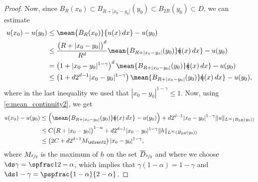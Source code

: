\begin{proof}
Now, since $B_{R}(x_0)\subset B_{R+|x_0-y_0|}(y_0)\subset B_{2R}(y_0)\subset D$, we can estimate
\begin{align*}
u(x_0)-u(y_0)&\le \mean{B_R(x_0)}{u(x)\,dx}-u(y_0)\\
&\le \frac{\big(R+|x_0-y_0|\big)^d}{R^d}\mean{B_{R+|x_0-y_0|}(y_0)}{\hspace*{-2mm}u(x)\,dx}-u(y_0)\\
&= \left(1+|x_0-y_0|^{1-\gamma}\right)^d\mean{B_{R+|x_0-y_0|}(y_0)}{\hspace*{-2mm}u(x)\,dx}-u(y_0)\\
&\le \left(1+d2^{d-1}|x_0-y_0|^{1-\gamma}\right)\mean{B_{R+|x_0-y_0|}(y_0)}{\hspace*{-2mm}u(x)\,dx}-u(y_0),
\end{align*}
where in the last inequality we used that $|x_0-y_0|^{1-\gamma}\le 1$. Now, using \eqref{e:mean_continuity2}, we get
\begin{align*}
u(x_0)-u(y_0)
&\le \Big(\mean{B_{R+|x_0-y_0|}(y_0)}{\hspace*{-2mm}u(x)\,dx}-u(y_0)\Big)+d2^{d-1}|x_0-y_0|^{1-\gamma}\|u\|_{L^\infty(B_{2R}(y_0))}\\
&\le C\big(R+|x_0-y_0|\big)^{1-\alpha}+d2^{d-1}|x_0-y_0|^{1-\gamma}\|h\|_{L^\infty(B_{2R}(y_0))}\\
&\le \left(2C+d2^{d-1}M_{\sfrac\delta2}\right)|x_0-y_0|^{1-\gamma},
\end{align*}
where $M_{\sfrac\delta2}$ is the maximum of $h$ on the set $\overline D_{\sfrac\delta2}$ and where we choose $\ds\gamma=\spfrac1{2-\alpha}$, which implies that
$\gamma(1-\alpha)=1-\gamma$ and $\ds1-\gamma=\pspfrac{1-\alpha}{2-\alpha}$.
\end{proof}


